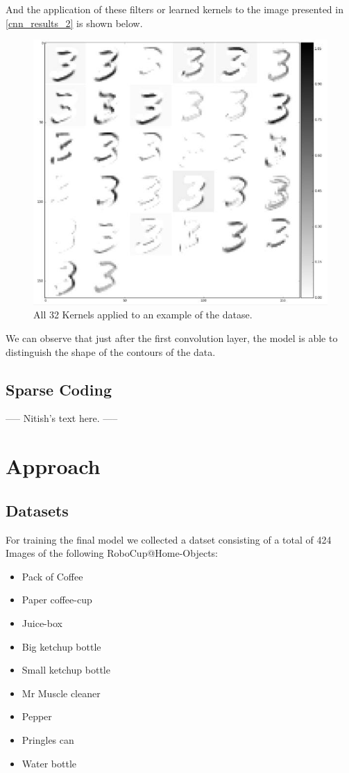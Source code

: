 \documentclass[	DIV=calc,%
				paper=a4,%
				fontsize=11pt,%
				twocolumn]{scrartcl}	 %
\begin{document}
And the application of these filters or learned kernels to the image presented in \ref{cnn_results_2} is shown below. 

\begin{figure}[H]
    \centering
    \includegraphics[width=0.8\linewidth]{data/cnn_results_4.png}
    \caption{All 32 Kernels applied to an example of the datase.}
    \label{cnn_results_4.png}
\end{figure}

We can observe that just after the first convolution layer, the model is able to distinguish the shape of the contours of the data. 

\subsection*{Sparse Coding}
----- Nitish's text here. -----

\section{Approach}

\subsection*{Datasets}
For training the final model we collected a datset consisting of a total of 424 Images of the following RoboCup@Home-Objects:
\begin{itemize}
    \item Pack of Coffee
    \item Paper coffee-cup
    \item Juice-box
    \item Big ketchup bottle
    \item Small ketchup bottle
    \item Mr Muscle cleaner
    \item Pepper
    \item Pringles can
    \item Water bottle
\end{itemize}
\end{document}
